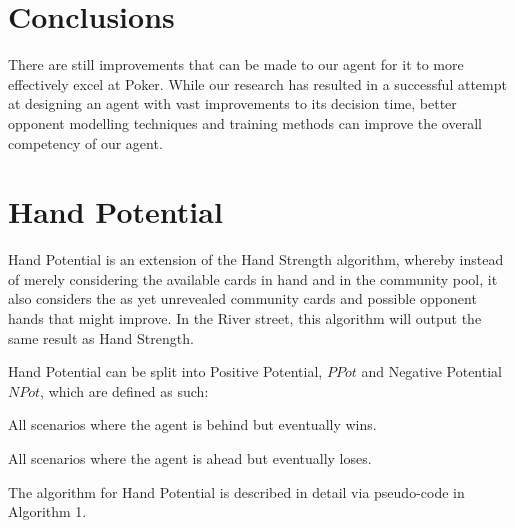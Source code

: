 \documentclass{article}
\begin{document}
\section{Conclusions}

There are still improvements that can be made to our agent for it to more effectively excel at Poker. While our research has resulted in a successful attempt at designing an agent with vast improvements to its decision time, better opponent modelling techniques and training methods can improve the overall competency of our agent.

\iffalse
\section{Hand Potential}

Hand Potential is an extension of the Hand Strength algorithm, whereby instead of merely considering the available cards in hand and in the community pool, it also considers the as yet unrevealed community cards and possible opponent hands that might improve. In the River street, this algorithm will output the same result as Hand Strength.

Hand Potential can be split into Positive Potential, $PPot$ and Negative Potential $NPot$, which are defined as such:
\begin{description}[style=multiline,leftmargin=10mm]
\item [\emph{PPot}]All scenarios where the agent is behind but eventually wins.
\item [\emph{NPot}]All scenarios where the agent is ahead but eventually loses.
\end{description}

The algorithm for Hand Potential is described in detail via pseudo-code in Algorithm 1.
\end{document}
